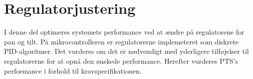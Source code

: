 \part{Regulatorjustering}
I denne del optimeres systemets performance ved at ændre på regulatorene for pan og tilt. 
På mikrocontrolleren er regulatorerne implemeteret som diskrete PID-algoritmer.
Det vurderes om det er nødvendigt med yderligere tilføjelser til regulatorerne 
for at opnå den ønskede performance.
Herefter vurderes PTS's performance i forhold til kravspecifikationen.

